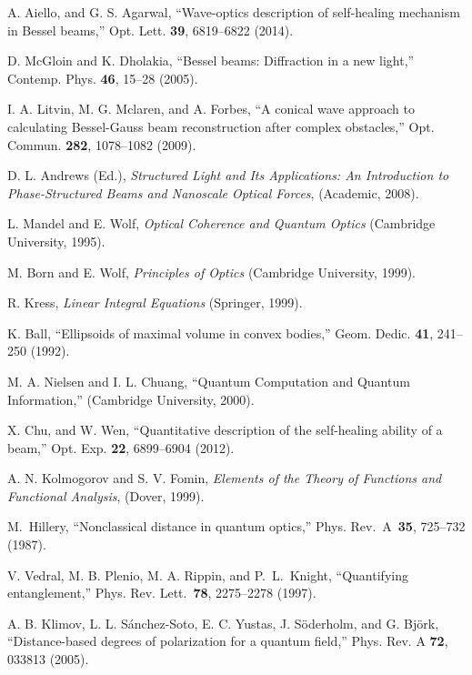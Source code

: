 \documentclass[10pt]{article}
\begin{document}
\begin{thebibliography}{99}
A. Aiello, and G. S. Agarwal, 
``Wave-optics  description of self-healing mechanism in Bessel beams,''
  Opt. Lett. \textbf{39}, 6819--6822 (2014).

D. McGloin and K. Dholakia,
``Bessel beams: Diffraction in a new light,''
Contemp. Phys. \textbf{46}, 15--28 (2005).

I. A. Litvin, M. G. Mclaren, and A. Forbes, 
``A conical wave approach to calculating {Bessel-Gauss} beam
reconstruction after complex obstacles,'' 
Opt. Commun. \textbf{282}, 1078--1082 (2009).

D. L. Andrews (Ed.),  \textit{Structured Light and Its Applications: An
Introduction to Phase-Structured Beams and Nanoscale Optical Forces},
(Academic, 2008).

L. Mandel and E. Wolf, 
\emph{Optical Coherence  and Quantum Optics}
(Cambridge University,  1995).

M. Born and E. Wolf, 
\emph{Principles of Optics}
 (Cambridge University, 1999).

R. Kress, 
\emph{Linear Integral Equations}
 (Springer, 1999).

K. Ball,
``Ellipsoids of maximal volume in convex bodies,''
Geom. Dedic. \textbf{41}, 241--250 (1992).

M. A. Nielsen and I. L. Chuang, 
``Quantum  Computation and Quantum Information,'' 
(Cambridge University, 2000).

X. Chu, and W. Wen, 
``Quantitative description of the
  self-healing ability of a beam,'' 
Opt. Exp. \textbf{22}, 6899--6904  (2012).

A. N. Kolmogorov and S. V. Fomin,
  \emph{Elements of the Theory of Functions and Functional Analysis},
  (Dover, 1999).

M.~Hillery, 
``Nonclassical distance in quantum optics,''
Phys. Rev.~A~\textbf{35}, 725--732 (1987).

V. Vedral, M. B. Plenio, M. A. Rippin, and P.~L.~Knight, 
``Quantifying entanglement,''
Phys. Rev. Lett.~\textbf{78}, 2275--2278 (1997).  

A. B. Klimov, L. L. S\'anchez-Soto, E. C. Yustas, J. S\"{o}derholm, and G. Bj\"{o}rk,
``Distance-based degrees of polarization for a quantum field,''
Phys. Rev. A \textbf{72}, 033813 (2005).


\end{thebibliography}
\end{document}
